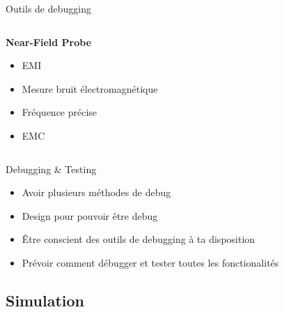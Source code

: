\begin{frame}[t]{Outils de debugging}
\begin{columns}[T]
        \begin{column}{0.33\textwidth}
            \vspace{-12pt}
            \begin{center}
                \textbf{Near-Field Probe}
            \end{center}
            \begin{itemize}
                \item EMI
                \bigskip
                \item Mesure bruit électromagnétique
                \item Fréquence précise
                \item EMC
            \end{itemize}
        \end{column}
    \end{columns}
    \vspace{-0.25\textwidth}
    \begin{columns}
        \begin{column}{0.33\textwidth}
        \end{column}
        \begin{column}{0.33\textwidth}
        \end{column}
        \begin{column}{0.33\textwidth}
        \end{column}
    \end{columns}
\end{frame}

\begin{frame}{Debugging \& Testing}
    \begin{itemize}
        \item Avoir plusieurs méthodes de debug
        \item Design pour pouvoir être debug
        \item Être conscient des outils de debugging à ta disposition
        \item Prévoir comment débugger et tester toutes les fonctionalités
    \end{itemize}
\end{frame}

\subsection{Simulation}